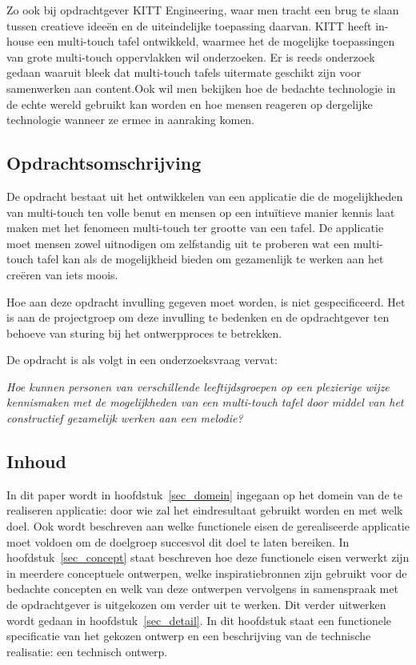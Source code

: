 \documentclass{acm}
\begin{document}
Zo ook bij opdrachtgever KITT Engineering, waar men tracht een brug te slaan tussen creatieve idee\"en en de uiteindelijke toepassing daarvan. KITT heeft in-house een multi-touch tafel ontwikkeld, waarmee het de mogelijke toepassingen van grote multi-touch oppervlakken wil onderzoeken. Er is reeds onderzoek gedaan waaruit bleek dat multi-touch tafels uitermate geschikt zijn voor samenwerken aan content.\cite{Shen}\cite{Ryall}Ook wil men bekijken hoe de bedachte technologie in de echte wereld gebruikt kan worden en hoe mensen reageren op dergelijke technologie wanneer ze ermee in aanraking komen.

\subsection{Opdrachtsomschrijving}
De opdracht bestaat uit het ontwikkelen van een applicatie die de mogelijkheden van multi-touch ten volle benut en mensen op een intu\"itieve manier kennis laat maken met het fenomeen multi-touch ter grootte van een tafel. De applicatie moet mensen zowel uitnodigen om zelfstandig uit te proberen wat een multi-touch tafel kan als de mogelijkheid bieden om gezamenlijk te werken aan het cre\"eren van iets moois.

Hoe aan deze opdracht invulling gegeven moet worden, is niet gespecificeerd. Het is aan de projectgroep om deze invulling te bedenken en de opdrachtgever ten behoeve van sturing bij het ontwerpproces te betrekken.

De opdracht is als volgt in een onderzoeksvraag vervat:

\textit{Hoe kunnen personen van verschillende leeftijdsgroepen op een plezierige wijze kennismaken met de mogelijkheden van een multi-touch tafel door middel van het constructief gezamelijk werken aan een melodie?}

\subsection{Inhoud}
In dit paper wordt in hoofdstuk~\ref{sec_domein} ingegaan op het domein van de te realiseren applicatie: door wie zal het eindresultaat gebruikt worden en met welk doel. Ook wordt beschreven aan welke functionele eisen de gerealiseerde applicatie moet voldoen om de doelgroep succesvol dit doel te laten bereiken. In hoofdstuk~\ref{sec_concept} staat beschreven hoe deze functionele eisen verwerkt zijn in meerdere conceptuele ontwerpen, welke inspiratiebronnen zijn gebruikt voor de bedachte concepten en welk van deze ontwerpen vervolgens in samenspraak met de opdrachtgever is uitgekozen om verder uit te werken. Dit verder uitwerken wordt gedaan in hoofdstuk~\ref{sec_detail}. In dit hoofdstuk staat een functionele specificatie van het gekozen ontwerp en een beschrijving van de technische realisatie: een technisch ontwerp.
\end{document}
